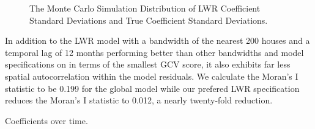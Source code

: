 \documentclass{article}\usepackage{graphicx, color}
\begin{document}
\begin{figure}
 \caption{The Monte Carlo Simulation Distribution of LWR Coefficient Standard Deviations and True Coefficient Standard Deviations.}
\end{figure}
 
In addition to the LWR model with a bandwidth of the nearest 200 houses and a temporal lag of 12 months performing better than other bandwidths and model specifications on in terms of the smallest GCV score, it also exhibits far less spatial autocorrelation within the model residuals. We calculate the Moran’s I statistic to be 0.199 for the global model while our prefered LWR specification reduces the Moran's I statistic to 0.012, a nearly twenty-fold reduction. 

Coefficients over time.




\end{document}
